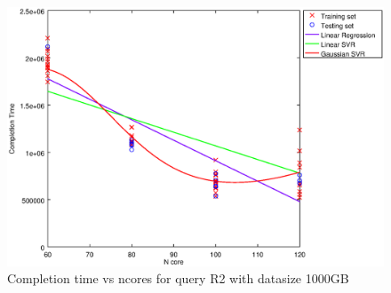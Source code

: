 
\begin {figure}[hbtp]
\centering
\includegraphics[width=\textwidth]{output/R2_1000_ONLY_1_LINEAR_NCORE/plot_R2_1000_bestmodels.eps}
\caption{Completion time vs ncores for query R2 with datasize 1000GB}
\label{fig:only_1_linear_R2_1000}
\end {figure}
